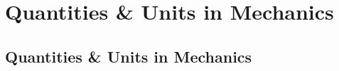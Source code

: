 \documentclass[../alevelmaths.tex]{subfiles}
\begin{document}
\chapter{Quantities \& Units in Mechanics}
\section{Quantities \& Units in Mechanics}
\end{document}
